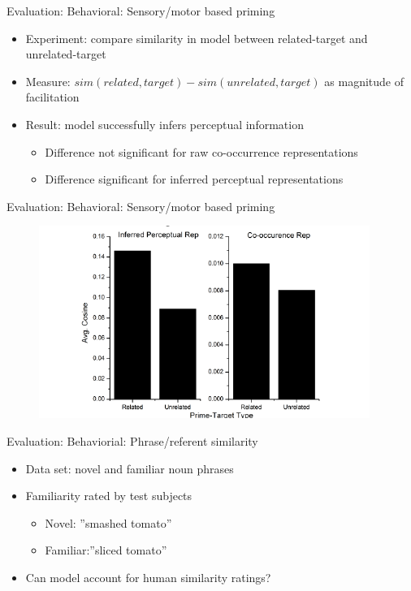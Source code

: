 \documentclass[12pt,a4paper]{beamer}
\begin{document}
\begin{frame}{Evaluation: Behavioral: Sensory/motor based priming}
\begin{itemize}
\item Experiment: compare similarity in model between related-target and unrelated-target
\item Measure: $sim(related,target) - sim(unrelated,target)$ as magnitude of facilitation
\item Result: model successfully infers perceptual information
    \begin{itemize}
    \item Difference not significant for raw co-occurrence representations
    \item Difference significant for inferred perceptual representations
    \end{itemize}
\end{itemize}
\end{frame}

\begin{frame}{Evaluation: Behavioral: Sensory/motor based priming}
\begin{figure}
\includegraphics[scale=0.8]{figure_4_perceptual_priming_results.png}
\end{figure}
\end{frame}


\begin{frame}{Evaluation: Behaviorial: Phrase/referent similarity}
\begin{itemize}
\item Data set: novel and familiar noun phrases 
\item Familiarity rated by test subjects
    \begin{itemize}
    \item Novel: ''smashed tomato''
    \item Familiar:''sliced tomato''
    \end{itemize}
\item Can model account for human similarity ratings?
\end{itemize}
\end{frame}
\end{document}

